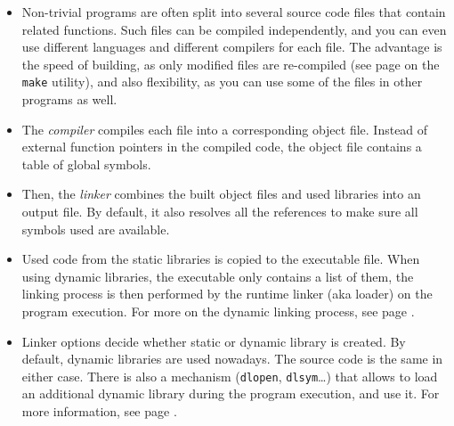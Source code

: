 \begin{itemize}
\item Non-trivial programs are often split into several source code files that
contain related functions.  Such files can be compiled independently, and you
can even use different languages and different compilers for each file.  The
advantage is the speed of building, as only modified files are re-compiled (see
page \pageref{MAKE} on the \texttt{make} utility), and also flexibility, as you
can use some of the files in other programs as well.
\item The \emph{compiler} compiles each file into a corresponding object file.
Instead of external function pointers in the compiled code, the object file
contains a table of global symbols.
\item Then, the \emph{linker} combines the built object files and used
libraries into an output file.  By default, it also resolves all the references
to make sure all symbols used are available.
\item Used code from the static libraries is copied to the executable file.
When using dynamic libraries, the executable only contains a list of them, the
linking process is then performed by the runtime linker (aka loader) on the
program execution.  For more on the dynamic linking process, see page
\pageref{RUNTIMELINKER}.
\item Linker options decide whether static or dynamic library is created.
By default, dynamic libraries are used nowadays.  The source code
is the same in either case.  There is also a mechanism (\texttt{dlopen},
\texttt{dlsym}\dots) that allows to load an additional dynamic library during
the program execution, and use it.  For more information, see page
\pageref{DLOPEN}.
\end{itemize}


\begin{slide}
\begin{center}

\end{center}
\end{slide}

